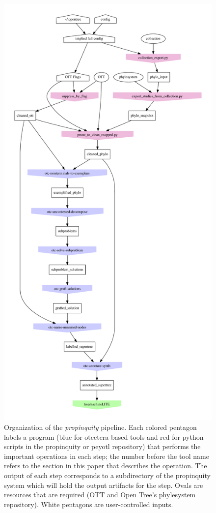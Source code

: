 \documentclass[fleqn,12pt,lineno,english]{wlpeerj}
\begin{document}
\begin{figure}
\begin{centering}
\includegraphics[height=0.70\paperheight]{pipeline-tools.pdf}
\par\end{centering}
\caption{Organization of the \emph{propinquity} pipeline. Each colored pentagon
labels a program (blue for otcetera-based tools and red for python
scripts in the propinquity or peyotl repository) that performs the
important operations in each step; the number before the tool name
refers to the section in this paper that describes the operation.
The output of each step corresponds to a subdirectory of the propinquity
system which will hold the output artifacts for the step. Ovals are
resources that are required (OTT and Open Tree's phylesystem repository).
White pentagons are user-controlled inputs.}
\label{fig:pipeline}
\end{figure}
\end{document}

